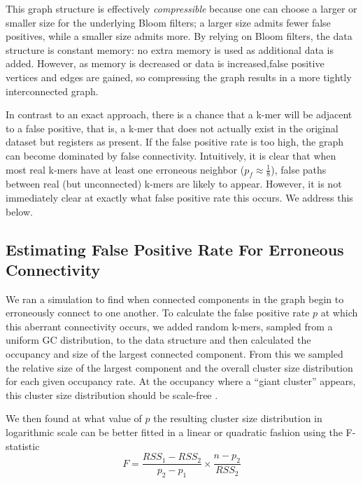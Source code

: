 \documentclass[12pt]{article} \usepackage{simplemargins}
\begin{document}
This graph structure is effectively {\em compressible}
because one can choose a larger
or smaller size for the underlying Bloom filters; a larger size admits fewer
false positives, while a smaller size admits more. By relying on Bloom
filters, the data structure is constant memory: no extra memory is
used as additional data is added. However, as memory is decreased or data
is increased,false positive vertices and edges are gained, so
compressing the graph results in a more tightly interconnected graph.

In contrast to an exact approach, there is a chance that a k-mer 
will be adjacent to a false positive,
that is, a k-mer
that does not actually exist in the original dataset but registers as present.
If the false positive rate is too high, the 
graph can become dominated by false connectivity. 
Intuitively, it is clear that when most real k-mers
have at least one erroneous neighbor ($p_f \approx \frac{1}{8}$), 
false paths between real (but unconnected) k-mers are likely to 
appear. However, it is not immediately clear at exactly what 
false positive rate this occurs. We address this below.  %

\subsection{Estimating False Positive Rate For Erroneous Connectivity}
We ran a simulation to find when connected components in the graph 
begin to erroneously connect to one another.
To calculate the false positive rate $p$ at which this aberrant 
connectivity occurs, 
we added random k-mers, sampled from a uniform GC distribution, to the data structure 
and then calculated the occupancy and size of 
the largest connected 
component. From this we sampled the relative size of 
the largest component and the overall cluster size distribution for each
given occupancy rate.
At the occupancy where a ``giant cluster'' appears, this cluster size distribution 
should be scale-free \cite{stauffer1979scaling}. 

We then found at what value of $p$ the resulting 
cluster size distribution in logarithmic 
scale can be better fitted in a linear or quadratic fashion using 
the F-statistic
\newline
\newline
\begin{displaymath}
F=\frac{RSS_1-RSS_2}{p_2-p_1} \times \frac{n - p_2}{RSS_2}
\end{displaymath}
\end{document}
